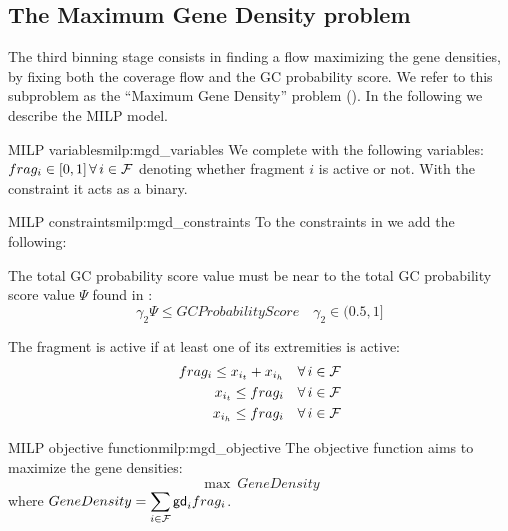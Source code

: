 \subsection{The Maximum Gene Density problem \MGD{}}\label{meth:max_gene_density}

The third binning stage consists in finding a flow maximizing the gene densities, by fixing both the coverage flow and the GC probability score.
We refer to this subproblem as the \enquote{Maximum Gene Density} problem (\MGD{}).
In the following we describe the MILP model.

\begin{definition}{\MGD{} MILP variables}{milp:mgd_variables}
  We complete  with the following variables:
  \(\frag{i} \in [0, 1] \, \forall i \in \Fragments{}\) denoting whether fragment \(i\) is active or not. With the constraint it acts as a binary.
\end{definition}

\begin{definition}{\MGC{} MILP constraints}{milp:mgd_constraints}
  To the constraints in  we add the following:

  The total GC probability score value must be near to the total GC probability score value \(\Psi{}\) found in \MGC{}:
  \begin{equation}
    \gamma_2 \Psi \leq GCProbabilityScore \quad \gamma_2 \in (0.5, 1]
  \end{equation}

  The fragment is active if at least one of its extremities is active:
  \begin{align}
    \frag{i} \leq x_{i_t} + x_{i_h} \quad \forall i \in \Fragments{} \\
    x_{i_t} \leq \frag{i} \quad \forall i \in \Fragments{} \\
    x_{i_h} \leq \frag{i} \quad \forall i \in \Fragments{}
  \end{align}
\end{definition}

\begin{definition}{\MGC{} MILP objective function}{milp:mgd_objective}
  The objective function aims to maximize the gene densities:
  \begin{equation}
    \max ~ GeneDensity
  \end{equation}
  where \(\displaystyle GeneDensity = \sum_{i \in \mathcal{F}{}} \mathsf{gd}_{i} frag_{i}\).
\end{definition}